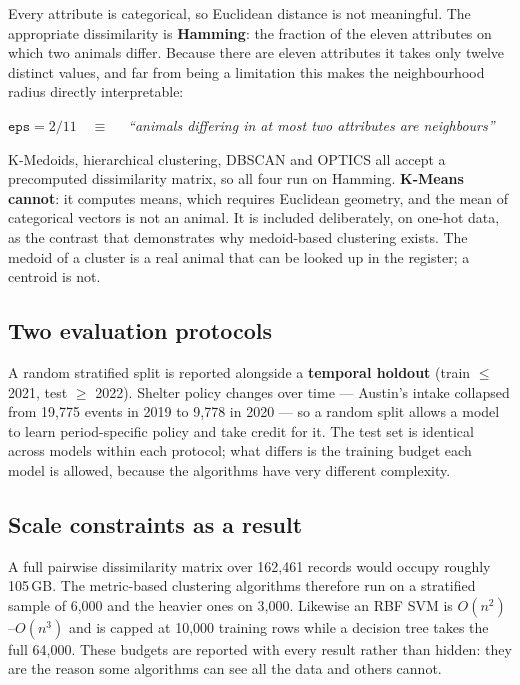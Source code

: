 \documentclass[11pt,a4paper]{article}
\begin{document}
Every attribute is categorical, so Euclidean distance is not meaningful. The
appropriate dissimilarity is \textbf{Hamming}: the fraction of the eleven
attributes on which two animals differ. Because there are eleven attributes it
takes only twelve distinct values, and far from being a limitation this makes
the neighbourhood radius directly interpretable:

\begin{center}
$\texttt{eps} = 2/11 \quad\equiv\quad$ \textit{``animals differing in at most two
attributes are neighbours''}
\end{center}

K-Medoids, hierarchical clustering, DBSCAN and OPTICS all accept a precomputed
dissimilarity matrix, so all four run on Hamming. \textbf{K-Means cannot}: it
computes means, which requires Euclidean geometry, and the mean of categorical
vectors is not an animal. It is included deliberately, on one-hot data, as the
contrast that demonstrates why medoid-based clustering exists. The medoid of a
cluster is a real animal that can be looked up in the register; a centroid is
not.

\subsection{Two evaluation protocols}

A random stratified split is reported alongside a \textbf{temporal holdout}
(train $\le$ 2021, test $\ge$ 2022). Shelter policy changes over time --- Austin's
intake collapsed from 19{,}775 events in 2019 to 9{,}778 in 2020 --- so a random
split allows a model to learn period-specific policy and take credit for it. The
test set is identical across models within each protocol; what differs is the
training budget each model is allowed, because the algorithms have very
different complexity.

\subsection{Scale constraints as a result}

A full pairwise dissimilarity matrix over 162{,}461 records would occupy roughly
105\,GB. The metric-based clustering algorithms therefore run on a stratified
sample of 6{,}000 and the heavier ones on 3{,}000. Likewise an RBF SVM is
$O(n^2)$--$O(n^3)$ and is capped at 10{,}000 training rows while a decision tree
takes the full 64{,}000. These budgets are reported with every result rather
than hidden: they are the reason some algorithms can see all the data and others
cannot.
\end{document}
